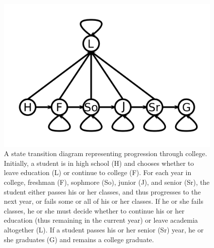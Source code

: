 \documentclass{article}
\begin{document}
\begin{figure}[!ht]
	\centering
	\includegraphics[width=120mm]{figs/college-progression.png}
	\caption{A state transition diagram representing progression through 
        college. Initially, a student is in high school (H) and chooses whether 
        to leave education (L) or continue to college (F). For each year in 
        college, freshman (F), sophmore (So), junior (J), and senior (Sr), the 
        student either passes his or her classes, and thus progresses to the 
        next year, or fails some or all of his or her classes. If he or she 
        fails classes, he or she must decide whether to continue his or her 
        education (thus remaining in the current year) or leave academia 
        altogether (L). If a student passes his or her senior (Sr) year, he 
        or she graduates (G) and remains a college graduate.}
\end{figure}

~\\
~\\
~\\
~\\
~\\
~\\
~\\
~\\
~\\
~\\
~\\
~\\
~\\
~\\
~\\
~\\
~\\
~\\
~\\
~\\
~\\
~\\
~\\
~\\
~\\
~\\
~\\
~\\
\end{document}
